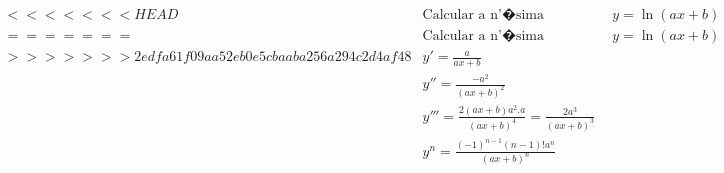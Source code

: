 \begin{ex}
\begin{align}
<<<<<<< HEAD
&\text{Calcular a n'�sima derivada de}\quad y=\ln{(ax+b)}\nonumber\\
=======
&\text{Calcular a n'�sima derivada de}\quad y=\ln{(ax+b)}\nonumber\\
>>>>>>> 2edfa61f09aa52eb0e5cbaaba256a294c2d4af48
&y'=\frac{a}{ax+b}\nonumber\\
&y''=\frac{-a^2}{(ax+b)^2}\nonumber\\
&y'''=\frac{2(ax+b)a^2.a}{(ax+b)^4}=\frac{2a^3}{(ax+b)^3}\nonumber\\
&y^{n}=\frac{(-1)^{n-1}(n-1)!a^{n}}{(ax+b)^{n}}\nonumber
\end{align}
\end{ex}